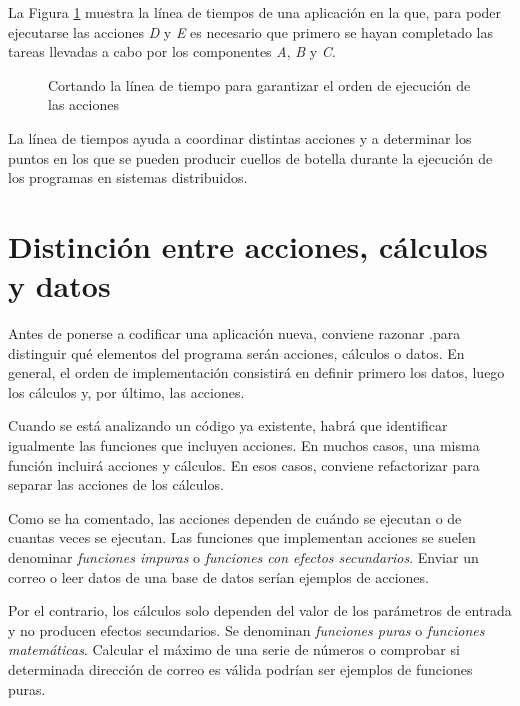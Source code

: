 La Figura \ref{fig_timeline_1} muestra la línea de tiempos de una aplicación en la que, para poder ejecutarse las acciones \textit{D} y \textit{E} es necesario que primero se hayan completado las tareas llevadas a cabo por los componentes \textit{A}, \textit{B} y \textit{C}.

\vspace{1em}
\begin{figure}[htb]
   \centering {}
   \caption{Cortando la línea de tiempo para garantizar el orden de ejecución de las acciones}
   \label{fig_timeline_1}
\end{figure}

La línea de tiempos ayuda a coordinar distintas acciones y a determinar los puntos en los que se pueden producir cuellos de botella durante la ejecución de los programas en sistemas distribuidos.

\section{Distinción entre acciones, cálculos y datos}
Antes de ponerse a codificar una aplicación nueva, conviene razonar .para distinguir qué elementos del programa serán acciones, cálculos o datos. En general, el orden de implementación consistirá en definir primero los datos, luego los cálculos y, por último, las acciones.

Cuando se está analizando un código ya existente, habrá que identificar igualmente las funciones que incluyen acciones. En muchos casos, una misma función incluirá acciones y cálculos. En esos casos, conviene refactorizar para separar las acciones de los cálculos.  

Como se ha comentado, las acciones dependen de cuándo se ejecutan o de cuantas veces se ejecutan. Las funciones que implementan acciones se suelen denominar \textit{funciones impuras} o \textit{funciones con efectos secundarios}. Enviar un correo o leer datos de una base de datos serían ejemplos de acciones.

Por el contrario, los cálculos solo dependen del valor de los parámetros de entrada y no producen efectos secundarios. Se denominan \textit{funciones puras} o \textit{funciones matemáticas}. Calcular el máximo de una serie de números o comprobar si determinada dirección de correo es válida podrían ser ejemplos de funciones puras. 

